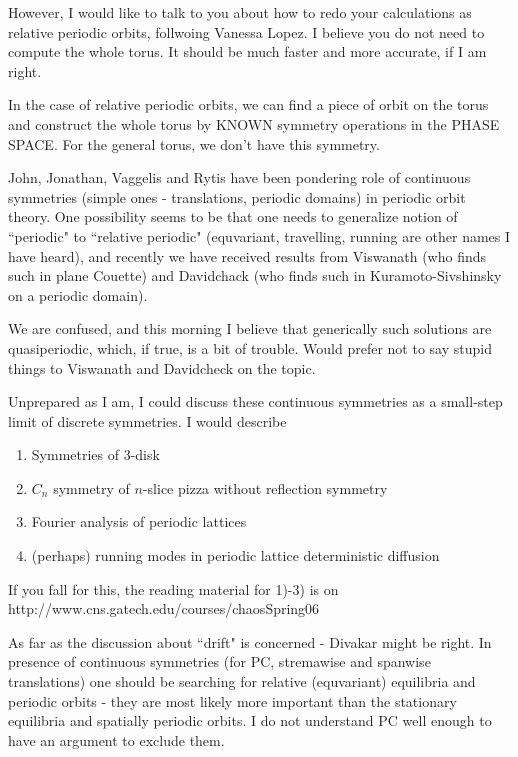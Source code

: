 However, I would like to talk to you about how to redo your calculations
as relative periodic orbits, follwoing Vanessa Lopez. I believe you do not
need to compute the whole torus. It should be much faster and more
accurate, if I am right.

      In the case of relative periodic orbits, we can find a piece of orbit on
the torus and construct the whole torus by KNOWN symmetry operations in the
PHASE SPACE. For the general torus, we don't have this symmetry. 

        John, Jonathan, Vaggelis and Rytis have been pondering role of
continuous symmetries (simple ones - translations, periodic domains) in
periodic orbit theory. One possibility seems to be that one needs to
generalize notion of ``periodic" to ``relative periodic" (equvariant,
travelling, running are other names I have heard), and recently
we have received results from Viswanath (who finds such in plane Couette)
and Davidchack (who finds such in Kuramoto-Sivshinsky on a periodic
domain).

        We are confused, and this morning I believe that generically such
solutions are quasiperiodic, which, if true, is a bit of trouble. Would
prefer not to say stupid things to Viswanath and Davidcheck on the topic.

        Unprepared as I am, I could discuss these continuous symmetries as
a small-step limit of discrete symmetries. I would describe

\begin{enumerate}
\item
        Symmetries of 3-disk
\item
        $C_n$ symmetry of $n$-slice pizza without reflection symmetry
\item
        Fourier analysis of periodic lattices
\item
        (perhaps) running modes in periodic lattice deterministic
           diffusion
\end{enumerate}

        If you fall for this, the reading material for 1)-3) is on
http://www.cns.gatech.edu/courses/chaosSpring06


As far as the discussion about ``drift" is concerned - Divakar might be
right. In presence of continuous symmetries (for PC, stremawise and
spanwise translations) one should be searching for relative (equvariant)
equilibria and periodic orbits - they are most likely more important than
the stationary equilibria and spatially periodic orbits. I do not
understand PC well enough to have an argument to exclude them.


